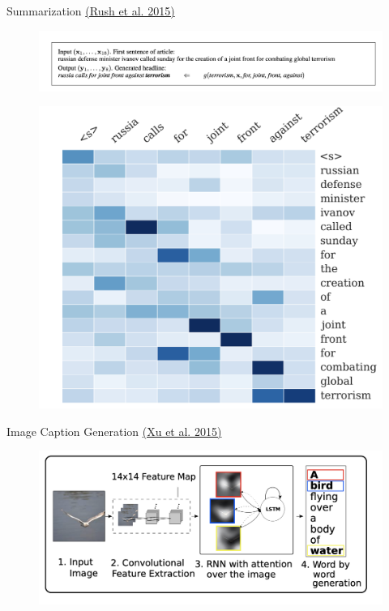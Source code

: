 \begin{frame}{Summarization \hyperref[https://www.aclweb.org/anthology/D15-1044.pdf]{\textcolor{myblue}{\large{(Rush et al. 2015)}}}}
    \begin{figure}
        \includegraphics[scale=0.27]{./figure/summrization1.png}
    \end{figure}
    \begin{figure}
        \includegraphics[scale=0.2]{./figure/summarization2.png}
    \end{figure}
\end{frame}

\begin{frame}{Image Caption Generation \hyperref[http://proceedings.mlr.press/v37/xuc15.html]{\textcolor{myblue}{\large{(Xu et al. 2015)}}}}
    \begin{figure}
        \includegraphics[scale=0.3]{./figure/image_captioning.png}
    \end{figure}
\end{frame}

